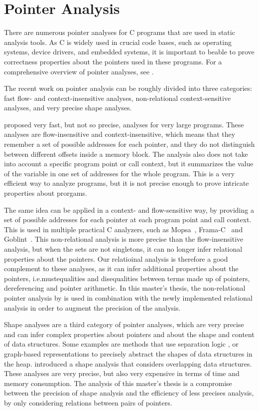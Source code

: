 \section{Pointer Analysis}

There are numerous pointer analyses for C programs that are used in static analysis tools.
As C is widely used in crucial code bases, such as operating systems, device drivers, and embedded systems,
it is important to beable to prove correctness properties about the pointers used in these programs.
For a comprehensive overview of pointer analyses, see \textcite{pointeranalysis}.

The recent work on pointer analysis can be roughly divided into three categories:
fast flow- and context-insensitive analyses, non-relational context-sensitive analyses, and very precise shape analyses.

\textcite{Andersen,Steensgaard} proposed very fast, but not so precise, analyses for very large programs.
These analyses are flow-insensitive and context-insensitive, which means that they remember a set of possible
addresses for each pointer, and they do not distinguish between different offsets inside a memory block.
The analysis also does not take into account a specific program point or call context, but it summarizes the
value of the variable in one set of addresses for the whole program.
This is a very efficient way to analyze programs, but it is not precise enough to prove intricate properties about prorgams.

The same idea can be applied in a context- and flow-sensitive way, by providing a set of possible addresses for each pointer at each program point and call context.
This is used in multiple practical C analyzers, such as \textsf{Mopsa}~\cite{mopsa}, \textsf{Frama-C}~\cite{framac,Bühler2024} and \textsf{Goblint}~\cite{goblint}.
This non-relational analysis is more precise than the flow-insensitive analysis, but when the sets are not singletons,
it can no longer infer relational properties about the pointers.
Our relatioinal analysis is therefore a good complement to these analyses, as it can infer additional
properties about the pointers, i.e.mustequalities and disequalities between terms made up of pointers, dereferencing and pointer arithmetic.
In this master's thesis, the non-relational pointer analysis by \textcite{goblint} is used in combination
with the newly implemented relational analysis in order to augment the precision of the analysis.

Shape analyses are a third category of pointer analyses, which are very precise and can infer complex properties about pointers and about the shape and content of data structures.
Some examples are methods that use separation logic \cite{separationlogic,rivalpapers},
or graph-based representations \cite{predator} to precisely abstract the shapes of data structures in the heap.
\textcite{kreiker} introduced a shape analysis that considers overlapping data structures.
These analyses are very precise, but also very expensive in terms of time and memory consumption.
The analysis of this master's thesis is a compromise between the precision of shape analysis and
the efficiency of less precises analysis, by only considering relations between pairs of pointers.

